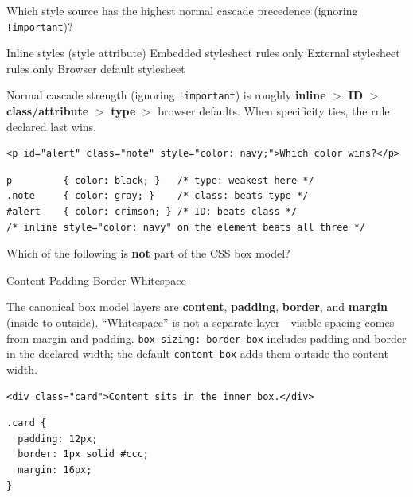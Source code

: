 \question[4]
Which style source has the highest normal cascade precedence (ignoring \texttt{!important})?
\begin{choices}
  \CorrectChoice Inline styles (style attribute)
  \choice Embedded stylesheet rules only
  \choice External stylesheet rules only
  \choice Browser default stylesheet
\end{choices}
\begin{solution}
  Normal cascade strength (ignoring \texttt{!important}) is roughly \textbf{inline} $>$ \textbf{ID} $>$ \textbf{class/attribute} $>$ \textbf{type} $>$ browser defaults. When specificity ties, the rule declared last wins.
\begin{lstlisting}[style=htmlinline]
<p id="alert" class="note" style="color: navy;">Which color wins?</p>
\end{lstlisting}
\begin{lstlisting}[style=cssinline]
p         { color: black; }   /* type: weakest here */
.note     { color: gray; }    /* class: beats type */
#alert    { color: crimson; } /* ID: beats class */
/* inline style="color: navy" on the element beats all three */
\end{lstlisting}
\end{solution}

\question[4]
Which of the following is \textbf{not} part of the CSS box model?
\begin{choices}
  \choice Content
  \choice Padding
  \choice Border
  \CorrectChoice Whitespace
\end{choices}
\begin{solution}
  The canonical box model layers are \textbf{content}, \textbf{padding}, \textbf{border}, and \textbf{margin} (inside to outside). ``Whitespace'' is not a separate layer---visible spacing comes from margin and padding. \lstinline[style=cssinline]|box-sizing: border-box| includes padding and border in the declared width; the default \lstinline[style=cssinline]|content-box| adds them outside the content width.
\begin{lstlisting}[style=htmlinline]
<div class="card">Content sits in the inner box.</div>
\end{lstlisting}
\begin{lstlisting}[style=cssinline]
.card {
  padding: 12px;
  border: 1px solid #ccc;
  margin: 16px;
}
\end{lstlisting}
\end{solution}

